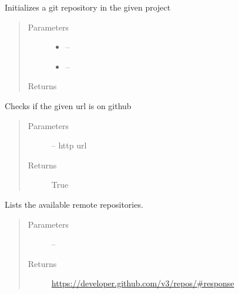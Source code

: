 \documentclass[letterpaper,10pt,english]{sphinxmanual}
\begin{document}
\begin{fulllineitems}
\label{_source/son_editor.impl:son_editor.impl.gitimpl.init}
Initializes a git repository in the given project
\begin{quote}\begin{description}
\item[{Parameters}] \leavevmode\begin{itemize}
\item {} 
 -- 

\item {} 
 -- 

\end{itemize}

\item[{Returns}] \leavevmode


\end{description}\end{quote}

\end{fulllineitems}


\begin{fulllineitems}
\label{_source/son_editor.impl:son_editor.impl.gitimpl.is_github}
Checks if the given url is on github
\begin{quote}\begin{description}
\item[{Parameters}] \leavevmode
{} -- http url

\item[{Returns}] \leavevmode
True

\end{description}\end{quote}

\end{fulllineitems}


\begin{fulllineitems}
\label{_source/son_editor.impl:son_editor.impl.gitimpl.list}
Lists the available remote repositories.
\begin{quote}\begin{description}
\item[{Parameters}] \leavevmode
{} -- 

\item[{Returns}] \leavevmode
\url{https://developer.github.com/v3/repos/\#response}

\end{description}\end{quote}

\end{fulllineitems}
\end{document}
